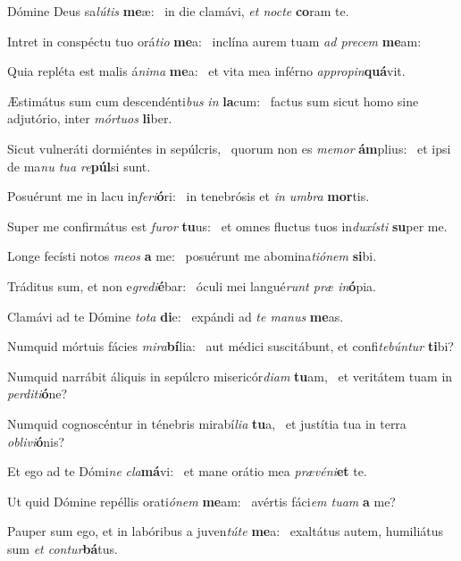 \item Dómine Deus sa\textit{lútis} \textbf{me}æ:~\psstar{} in die clamávi, \textit{et nocte} \textbf{co}ram te.
\item Intret in conspéctu tuo orá\textit{tio} \textbf{me}a:~\psstar{} inclína aurem tuam \textit{ad precem} \textbf{me}am:
\item Quia repléta est malis á\textit{nima} \textbf{me}a:~\psstar{} et vita mea inférno \textit{appropin}\textbf{quá}vit.
\item Æstimátus sum cum descendénti\textit{bus} \textit{in} \textbf{la}cum:~\psstar{} factus sum sicut homo sine adjutório, inter \textit{mórtuos} \textbf{li}ber.
\item Sicut vulneráti dormiéntes in sepúlcris,~\pscross{} quorum non es \textit{memor} \textbf{ám}plius:~\psstar{} et ipsi de ma\textit{nu tua re}\textbf{púl}si sunt.
\item Posuérunt me in lacu in\textit{feri}\textbf{ó}ri:~\psstar{} in tenebrósis et \textit{in umbra} \textbf{mor}tis.
\item Super me confirmátus est \textit{furor} \textbf{tu}us:~\psstar{} et omnes fluctus tuos in\textit{duxísti} \textbf{su}per me.
\item Longe fecísti notos \textit{meos} \textbf{a} me:~\psstar{} posuérunt me abomina\textit{tiónem} \textbf{si}bi.
\item Tráditus sum, et non e\textit{gredi}\textbf{é}bar:~\psstar{} óculi mei langué\textit{runt præ in}\textbf{ó}pia.
\item Clamávi ad te Dómine \textit{tota} \textbf{di}e:~\psstar{} expándi ad \textit{te manus} \textbf{me}as.
\item Numquid mórtuis fácies \textit{mira}\textbf{bí}lia:~\psstar{} aut médici suscitábunt, et confi\textit{tebúntur} \textbf{ti}bi?
\item Numquid narrábit áliquis in sepúlcro misericór\textit{diam} \textbf{tu}am,~\psstar{} et veritátem tuam in \textit{perditi}\textbf{ó}ne?
\item Numquid cognoscéntur in ténebris mirabí\textit{lia} \textbf{tu}a,~\psstar{} et justítia tua in terra \textit{oblivi}\textbf{ó}nis?
\item Et ego ad te Dómi\textit{ne} \textit{cla}\textbf{má}vi:~\psstar{} et mane orátio mea \textit{prævéni}\textbf{et} te.
\item Ut quid Dómine repéllis orati\textit{ónem} \textbf{me}am:~\psstar{} avértis fáci\textit{em tuam} \textbf{a} me?
\item Pauper sum ego, et in labóribus a juven\textit{túte} \textbf{me}a:~\psstar{} exaltátus autem, humiliátus sum \textit{et contur}\textbf{bá}tus.
